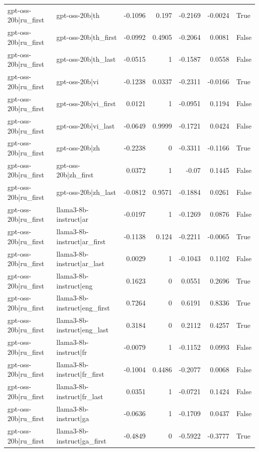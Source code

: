 \begin{table}
\begin{tabular}{l l r r r r l}
gpt-oss-20b|ru_first & gpt-oss-20b|th & -0.1096 & 0.197 & -0.2169 & -0.0024 & True \\
gpt-oss-20b|ru_first & gpt-oss-20b|th_first & -0.0992 & 0.4905 & -0.2064 & 0.0081 & False \\
gpt-oss-20b|ru_first & gpt-oss-20b|th_last & -0.0515 & 1 & -0.1587 & 0.0558 & False \\
gpt-oss-20b|ru_first & gpt-oss-20b|vi & -0.1238 & 0.0337 & -0.2311 & -0.0166 & True \\
gpt-oss-20b|ru_first & gpt-oss-20b|vi_first & 0.0121 & 1 & -0.0951 & 0.1194 & False \\
gpt-oss-20b|ru_first & gpt-oss-20b|vi_last & -0.0649 & 0.9999 & -0.1721 & 0.0424 & False \\
gpt-oss-20b|ru_first & gpt-oss-20b|zh & -0.2238 & 0 & -0.3311 & -0.1166 & True \\
gpt-oss-20b|ru_first & gpt-oss-20b|zh_first & 0.0372 & 1 & -0.07 & 0.1445 & False \\
gpt-oss-20b|ru_first & gpt-oss-20b|zh_last & -0.0812 & 0.9571 & -0.1884 & 0.0261 & False \\
gpt-oss-20b|ru_first & llama3-8b-instruct|ar & -0.0197 & 1 & -0.1269 & 0.0876 & False \\
gpt-oss-20b|ru_first & llama3-8b-instruct|ar_first & -0.1138 & 0.124 & -0.2211 & -0.0065 & True \\
gpt-oss-20b|ru_first & llama3-8b-instruct|ar_last & 0.0029 & 1 & -0.1043 & 0.1102 & False \\
gpt-oss-20b|ru_first & llama3-8b-instruct|eng & 0.1623 & 0 & 0.0551 & 0.2696 & True \\
gpt-oss-20b|ru_first & llama3-8b-instruct|eng_first & 0.7264 & 0 & 0.6191 & 0.8336 & True \\
gpt-oss-20b|ru_first & llama3-8b-instruct|eng_last & 0.3184 & 0 & 0.2112 & 0.4257 & True \\
gpt-oss-20b|ru_first & llama3-8b-instruct|fr & -0.0079 & 1 & -0.1152 & 0.0993 & False \\
gpt-oss-20b|ru_first & llama3-8b-instruct|fr_first & -0.1004 & 0.4486 & -0.2077 & 0.0068 & False \\
gpt-oss-20b|ru_first & llama3-8b-instruct|fr_last & 0.0351 & 1 & -0.0721 & 0.1424 & False \\
gpt-oss-20b|ru_first & llama3-8b-instruct|ga & -0.0636 & 1 & -0.1709 & 0.0437 & False \\
gpt-oss-20b|ru_first & llama3-8b-instruct|ga_first & -0.4849 & 0 & -0.5922 & -0.3777 & True \\

\end{tabular}
\end{table}
